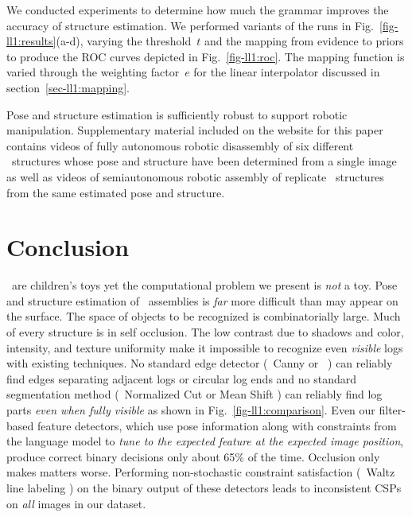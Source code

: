 We conducted experiments to determine how much the grammar improves the
accuracy of structure estimation.
%
We performed variants of the runs in Fig.~\ref{fig-ll1:results}(a-d), varying the
threshold~$t$ and the mapping from evidence to priors to produce the ROC curves
depicted in Fig.~\ref{fig-ll1:roc}.
%
The mapping function is varied through the weighting factor~$e$ for the linear
interpolator discussed in section~\ref{sec-ll1:mapping}.

Pose and structure estimation is sufficiently robust to support robotic
manipulation.
%
Supplementary material included on the website for this paper contains videos
of fully autonomous robotic disassembly of six different \LincolnLog\
structures whose pose and structure have been determined from a single image as
well as videos of semiautonomous robotic assembly of replicate \LincolnLog\
structures from the same estimated pose and structure.

\section{Conclusion}
\label{sec-ll1:conclusion}

\LincolnLogs\ are children's toys yet the computational problem we present is
\emph{not} a toy.
%
Pose and structure estimation of \LincolnLog\ assemblies is \emph{far} more
difficult than may appear on the surface.
%
The space of objects to be recognized is combinatorially large.
%
Much of every structure is in self occlusion.
%
The low contrast due to shadows and color, intensity, and texture uniformity
make it impossible to recognize even \emph{visible} logs with existing
techniques.
%
No standard edge detector (\eg\ Canny \cite{Canny1986} or \Pb\
\cite{Maire2008}) can reliably find edges separating adjacent logs or circular
log ends and no standard segmentation method (\eg\ Normalized Cut
\cite{Shi2000} or Mean Shift \cite{Comaniciu2002}) can reliably find log parts
\emph{even when fully visible} as shown in Fig.~\ref{fig-ll1:comparison}.
%
Even our filter-based feature detectors, which use pose information along with
constraints from the language model to \emph{tune to the expected feature at
  the expected image position}, produce correct binary decisions only about
65\% of the time.
%
Occlusion only makes matters worse.
%
Performing non-stochastic constraint satisfaction (\eg\ Waltz line labeling
\cite{Waltz1975}) on the binary output of these detectors leads to
inconsistent CSPs on \emph{all} images in our dataset.

